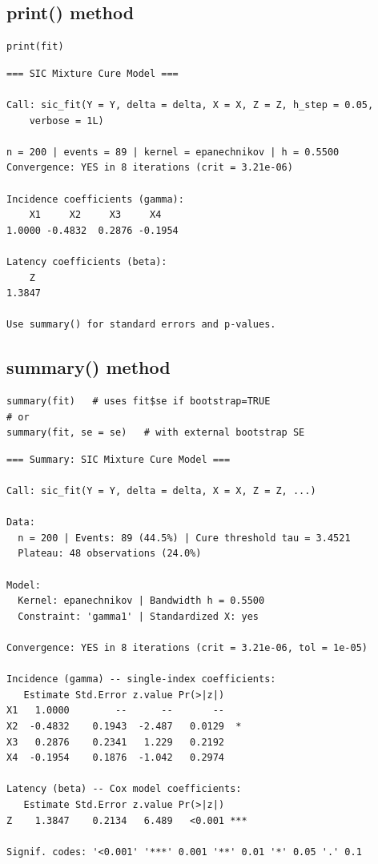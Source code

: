 \documentclass[12pt,a4paper]{article}
\begin{document}
\subsection{print() method}

\begin{lstlisting}[style=Rcode, caption={Compact display}]
print(fit)
\end{lstlisting}

\begin{lstlisting}[style=Routput]
=== SIC Mixture Cure Model ===

Call: sic_fit(Y = Y, delta = delta, X = X, Z = Z, h_step = 0.05,
    verbose = 1L)

n = 200 | events = 89 | kernel = epanechnikov | h = 0.5500
Convergence: YES in 8 iterations (crit = 3.21e-06)

Incidence coefficients (gamma):
    X1     X2     X3     X4
1.0000 -0.4832  0.2876 -0.1954

Latency coefficients (beta):
    Z
1.3847

Use summary() for standard errors and p-values.
\end{lstlisting}

\subsection{summary() method}

\begin{lstlisting}[style=Rcode, caption={Summary with p-values}]
summary(fit)   # uses fit$se if bootstrap=TRUE
# or
summary(fit, se = se)   # with external bootstrap SE
\end{lstlisting}

\begin{lstlisting}[style=Routput]
=== Summary: SIC Mixture Cure Model ===

Call: sic_fit(Y = Y, delta = delta, X = X, Z = Z, ...)

Data:
  n = 200 | Events: 89 (44.5%) | Cure threshold tau = 3.4521
  Plateau: 48 observations (24.0%)

Model:
  Kernel: epanechnikov | Bandwidth h = 0.5500
  Constraint: 'gamma1' | Standardized X: yes

Convergence: YES in 8 iterations (crit = 3.21e-06, tol = 1e-05)

Incidence (gamma) -- single-index coefficients:
   Estimate Std.Error z.value Pr(>|z|)
X1   1.0000        --      --       --
X2  -0.4832    0.1943  -2.487   0.0129  *
X3   0.2876    0.2341   1.229   0.2192
X4  -0.1954    0.1876  -1.042   0.2974

Latency (beta) -- Cox model coefficients:
   Estimate Std.Error z.value Pr(>|z|)
Z    1.3847    0.2134   6.489   <0.001 ***

Signif. codes: '<0.001' '***' 0.001 '**' 0.01 '*' 0.05 '.' 0.1
\end{lstlisting}
\end{document}
